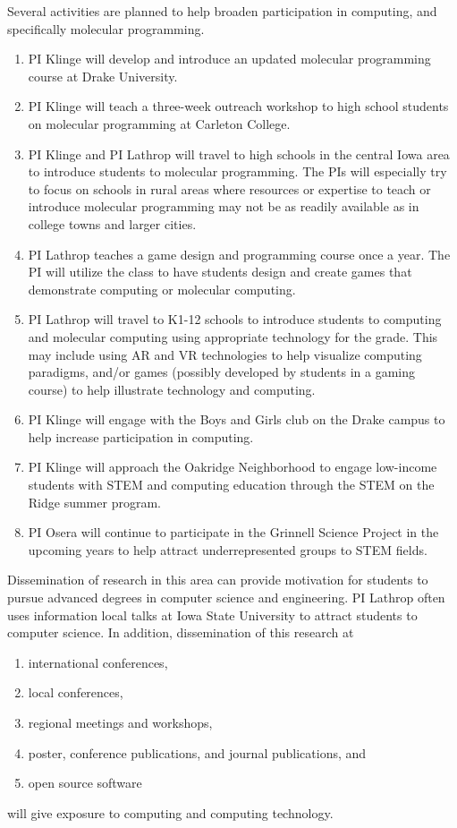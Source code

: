 \documentclass[11pt]{article}
\begin{document}
Several activities are planned to help broaden participation in computing, and specifically molecular programming.
\begin{enumerate}
	
	\item PI Klinge will develop and introduce an updated molecular programming course at Drake University.
	\item PI Klinge will teach a three-week outreach workshop to high school students on molecular programming at Carleton College.
	\item PI Klinge and PI Lathrop will travel to high schools in the central Iowa area to introduce students to molecular programming.  The PIs will especially try to focus on schools in rural areas where resources or expertise to teach or introduce molecular programming may not be as readily available as in college towns and larger cities.
	\item PI Lathrop teaches a game design and programming course once a year.  The PI will utilize the class to have students design and create games that demonstrate computing or molecular computing.
	\item PI Lathrop will travel to K1-12 schools to introduce students to computing and molecular computing using appropriate technology for the grade.  This may include using AR and VR technologies to help visualize computing paradigms, and/or games (possibly developed by students in a gaming course) to help illustrate technology and computing.
	\item PI Klinge will engage with the Boys and Girls club on the Drake campus to help increase participation in computing.
	\item PI Klinge will approach the Oakridge Neighborhood to engage low-income students with STEM and computing education through the STEM on the Ridge summer program.
	\item PI Osera will continue to participate in the Grinnell Science Project in the upcoming years to help attract underrepresented groups to STEM fields.
\end{enumerate}

Dissemination of research in this area can provide motivation for students to pursue advanced degrees in computer science and engineering.  PI Lathrop often uses information local talks at Iowa State University to attract students to computer science.  In addition, dissemination of this research at
\begin{enumerate}
	\item international conferences,
	\item local conferences,
	\item regional meetings and workshops,
	\item poster, conference publications, and journal publications, and
	\item open source software
\end{enumerate}
will give exposure to computing and computing technology.
\end{document}
